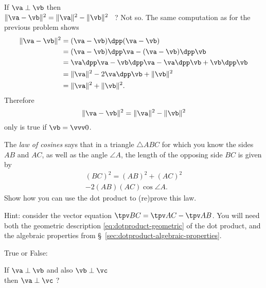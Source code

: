 \begin{multicols}{2}
\subprob If  $\va\perp\vb$ then\\[1ex]
\null\quad$ \|\va-\vb\|^2 = \|\va\|^2 - \|\vb\|^2$  ~?%
\answer%
Not so.
The same computation as for the previous problem shows
\begin{align*}
  \|\va - \vb\|^2 &= (\va-\vb) \dpp (\va-\vb)\\
  &= (\va-\vb) \dpp \va  - (\va-\vb) \dpp\vb\\
  &= \va \dpp \va -\vb \dpp \va  - \va \dpp\vb + \vb \dpp\vb\\
  &= \|\va\|^2 - 2 \va \dpp\vb + \| \vb \|^2\\
  &= \|\va\|^2 + \| \vb \|^2.
\end{align*}
Therefore
\[
\|\va-\vb\|^2 = \|\va\|^2 - \|\vb\|^2
\]
only is true if $\vb=\vvv0$.
\endanswer


\problem \label{prb:law-of-cosines-and-dotprod}%
The \textit{law of cosines} says that in a triangle $\triangle ABC$
for which you know the sides $AB$ and $AC$, as well as the angle
$\angle A$, the length of the opposing side $BC$ is given by
\begin{multline*}
  (BC)^2 = (AB)^2 + (AC)^2\\  - 2(AB)(AC)\cos\angle A.
\end{multline*}
Show how you can use the dot product to (re)prove this law.

Hint: consider the vector equation $\tpv BC = \tpv AC - \tpv AB$.  You will need both
the geometric description \eqref{eq:dotproduct-geometric} of the dot product, and the
algebraic properties from \S~\ref{sec:dotproduct-algebraic-properties}.

\problem True or False:%

\subprob If $\va\perp\vb$ and also $\vb\perp\vc$\\[0.5ex]
  \null\hfill then $\va\perp\vc$ ?


\end{multicols}

